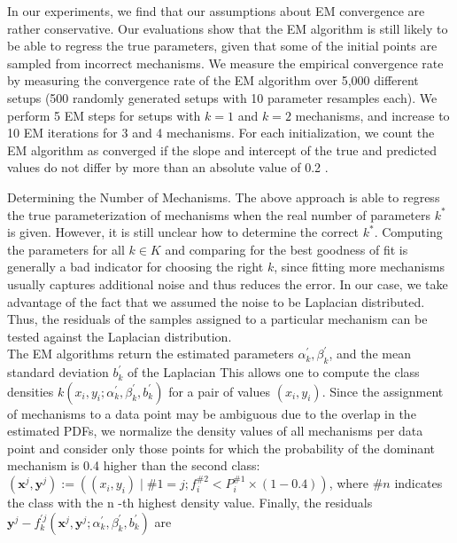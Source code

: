 \documentclass[10pt]{article}
\begin{document}
In our experiments, we find that our assumptions about EM convergence are rather conservative. Our evaluations show that the EM algorithm is still likely to be able to regress the true parameters, given that some of the initial points are sampled from incorrect mechanisms. We measure the empirical convergence rate by measuring the convergence rate of the EM algorithm over 5,000 different setups (500 randomly generated setups with 10 parameter resamples each). We perform 5 EM steps for setups with $k=1$ and $k=2$ mechanisms, and increase to 10 EM iterations for 3 and 4 mechanisms. For each initialization, we count the EM algorithm as converged if the slope and intercept of the true and predicted values do not differ by more than an absolute value of 0.2 .

Determining the Number of Mechanisms. The above approach is able to regress the true parameterization of mechanisms when the real number of parameters $k^{*}$ is given. However, it is still unclear how to determine the correct $k^{*}$. Computing the parameters for all $k \in K$ and comparing for the best goodness of fit is generally a bad indicator for choosing the right $k$, since fitting more mechanisms usually captures additional noise and thus reduces the error. In our case, we take advantage of the fact that we assumed the noise to be Laplacian distributed. Thus, the residuals of the samples assigned to a particular mechanism can be tested against the Laplacian distribution.\\
The EM algorithms return the estimated parameters $\alpha_{k}^{\prime}, \beta_{k}^{\prime}$, and the mean standard deviation $b_{k}^{\prime}$ of the Laplacian This allows one to compute the class densities $k\left(x_{i}, y_{i} ; \alpha_{k}^{\prime}, \beta_{k}^{\prime}, b_{k}^{\prime}\right)$ for a pair of values $\left(x_{i}, y_{i}\right)$. Since the assignment of mechanisms to a data point may be ambiguous due to the overlap in the estimated PDFs, we normalize the density values of all mechanisms per data point and consider only those points for which the probability of the dominant mechanism is 0.4 higher than the second class: $\left(\mathbf{x}^{j}, \mathbf{y}^{j}\right):=\left(\left(x_{i}, y_{i}\right) \mid \# 1=j ; f_{i}^{\# 2}<P_{i}^{\# 1} \times(1-0.4)\right)$, where $\# n$ indicates the class with the n -th highest density value. Finally, the residuals $\mathbf{y}^{j}-f_{k}^{\prime j}\left(\mathbf{x}^{j}, \mathbf{y}^{j} ; \alpha_{k}^{\prime}, \beta_{k}^{\prime}, b_{k}^{\prime}\right)$ are
\end{document}
